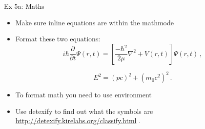 \documentclass[10pt,times]{beamer}
\begin{document}
\begin{frame}{Ex 5a: Maths}

\begin{itemize}
\item Make sure inline equations are within the mathmode \cmmd{\$\dots\$}
\item Format these two equations:
\begin{equation*}
i \hbar \frac{\partial}{\partial t} \Psi(r,t) = 
\left[\frac{-\hbar^2}{2\mu}\nabla^2+V(r,t)\right]\Psi(r,t) \,,
\end{equation*}

\begin{equation*}
E^2 = (pc)^2 + (m_0 c^2)^2 \,.
\end{equation*}

\begin{center}
\end{center}
\item To format math you need to use  environment
\item Use detexify to find out what the symbols are 
\href{http://detexify.kirelabs.org/classify.html}{http://detexify.kirelabs.org/classify.html}
.
\end{itemize}

\end{frame}
\end{document}
